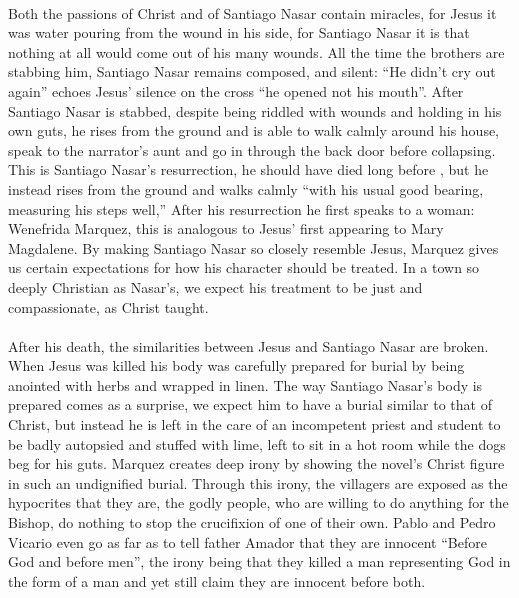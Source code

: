 \documentclass[11pt,a4wide]{article}
\begin{document}
\paragraph{}Both the passions of Christ and of Santiago Nasar contain miracles, 
for Jesus it was water pouring from the wound in his side, for Santiago Nasar it 
is that nothing at all would come out of his many wounds. All the time the 
brothers are stabbing him, Santiago Nasar remains composed, and silent: ``He 
didn't cry out again'' echoes Jesus' silence on the cross ``he opened not his 
mouth''\cite[Isaih 53:7]{bible}. After Santiago Nasar is stabbed, despite being 
riddled with wounds and holding in his own guts, he rises from the ground and
is able to walk calmly around his house,  speak to the narrator's aunt and go
in through the back door before collapsing. This is  Santiago Nasar's 
resurrection, he should have died long before , but he instead rises from the 
ground and walks calmly ``with his usual good bearing, measuring his steps 
well,'' \cite[pg.~120]{chronicle} After his resurrection he first speaks to
a woman: Wenefrida Marquez, this is analogous to Jesus' first appearing to Mary 
Magdalene. By making Santiago Nasar so closely resemble Jesus, Marquez gives us 
certain expectations for how his character should be treated. In a town so 
deeply Christian as Nasar's, we expect his treatment to be just and 
compassionate, as Christ taught.

\paragraph{} After his death, the similarities between Jesus and Santiago Nasar 
are broken. When Jesus was killed his body was carefully prepared for burial by 
being anointed with herbs and wrapped in linen. The way Santiago Nasar's body is 
prepared comes as a surprise, we expect him to have a burial similar to that of 
Christ, but instead he is left in the care of an incompetent priest and student 
to be badly autopsied and stuffed with lime, left to sit in a hot room while the 
dogs beg for his guts. Marquez creates deep irony by showing the novel's Christ 
figure in such an undignified burial. Through this irony, the villagers are 
exposed as the hypocrites that they are, the godly people, who are willing to do 
anything for the Bishop, do nothing to stop the crucifixion of one of their own. 
Pablo and Pedro Vicario even go as far as to tell father Amador that they are 
innocent ``Before God and before men'',  the irony being that they killed a man 
representing God in the form of a man and yet still claim they are innocent 
before both.  
\end{document}
